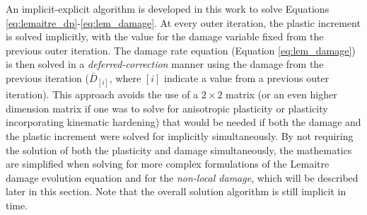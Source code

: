 \documentclass[sn-mathphys,Numbered,draft]{sn-jnl}%
\begin{document}
An implicit-explicit algorithm is developed in this work to solve Equations \ref{eq:lemaitre_dp}-\ref{eq:lem_damage}.
At every outer iteration, the plastic increment is solved implicitly, with the value for the damage variable fixed from the previous outer iteration.
The damage rate equation (Equation \ref{eq:lem_damage}) is then solved in a \emph{deferred-correction} manner using the damage from the previous iteration ($\bar{D}_{[i]}$, where $[i]$ indicate a value from a previous outer iteration).
This approach avoids the use of a $2 \times 2$ matrix (or an even higher dimension matrix if one was to solve for anisotropic plasticity or plasticity incorporating kinematic hardening) that would be needed if both the damage and the plastic increment were solved for implicitly simultaneously.
By not requiring the solution of both the plasticity and damage simultaneously, the mathematics are simplified when solving for more complex formulations of the Lemaitre damage evolution equation and for the \emph{non-local damage}, which will be described later in this section.
Note that the overall solution algorithm is still implicit in time.

%


\end{document}
